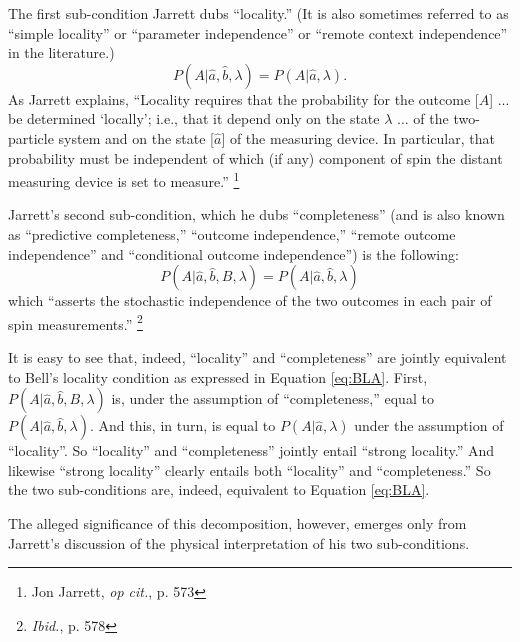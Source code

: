 \documentclass[12pt]{article}
\begin{document}
The first sub-condition Jarrett dubs ``locality.''  (It is also
sometimes referred to as ``simple locality'' or ``parameter
independence'' or ``remote context independence'' in the literature.)
\begin{equation}
P(A | \hat{a},\hat{b}, \lambda) = P(A| \hat{a}, \lambda).
\label{eq:JL}
\end{equation}
As Jarrett explains, ``Locality requires that the probability for the 
outcome
[$A$] ... be determined `locally'; i.e., that it depend only on the
state $\lambda$ ... of the two-particle system and on the state
[$\hat{a}$] of the measuring device.  In particular, that probability
must be independent of which (if any) component of spin the distant
measuring device is set to measure.''  
\footnote{Jon Jarrett, \emph{op cit.}, p. 573}

Jarrett's second sub-condition, which he dubs ``completeness'' (and is
also known as ``predictive completeness,'' ``outcome
independence,'' ``remote outcome independence'' and ``conditional 
outcome independence'') is the following:  
\begin{equation}
P(A | \hat{a}, \hat{b}, B, \lambda) = P(A | \hat{a}, \hat{b}, \lambda)
\label{eq:JC}
\end{equation}
which ``asserts the stochastic independence of
the two outcomes in each pair of spin measurements.''
\footnote{\emph{Ibid.}, p. 578}

It is easy to see that, indeed, ``locality'' and ``completeness'' are
jointly equivalent to Bell's locality condition as expressed in
Equation \ref{eq:BLA}.  First, $P(A|\hat{a},\hat{b},B,\lambda)$ is,
under the assumption of ``completeness,'' equal to
$P(A|\hat{a},\hat{b}, \lambda)$.  And this, in turn, is equal to $P(A |
\hat{a}, \lambda)$ under the assumption of ``locality''.  So
``locality'' and ``completeness'' jointly entail ``strong locality.''
And likewise ``strong locality'' clearly entails both ``locality''
and ``completeness.''  So the two sub-conditions are, indeed,
equivalent to Equation \ref{eq:BLA}.  

The alleged significance of this decomposition, however, emerges
only from Jarrett's discussion of the physical interpretation of his
two sub-conditions.  
\end{document}

